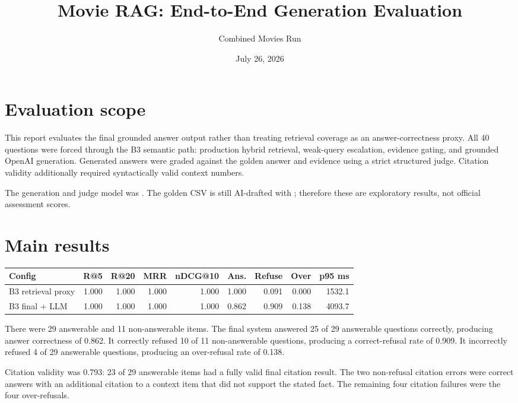 \documentclass[11pt]{article}
\title{Movie RAG: End-to-End Generation Evaluation}
\author{Combined Movies Run}
\date{July 26, 2026}
\begin{document}
\setlength{\emergencystretch}{3em}
\maketitle

\section{Evaluation scope}

This report evaluates the final grounded answer output rather than treating
retrieval coverage as an answer-correctness proxy. All 40 questions were
forced through the B3 semantic path: production hybrid retrieval, weak-query
escalation, evidence gating, and grounded OpenAI generation. Generated answers
were graded against the golden answer and evidence using a strict structured
judge. Citation validity additionally required syntactically valid context
numbers.

The generation and judge model was . The golden CSV is
still AI-drafted with ; therefore these are
exploratory results, not official assessment scores.

\section{Main results}

\begin{center}
\small
\begin{tabular}{lrrrrrrrr}
\hline
Config & R@5 & R@20 & MRR & nDCG@10 & Ans. & Refuse & Over & p95 ms \\
\hline
B3 retrieval proxy & 1.000 & 1.000 & 1.000 & 1.000 & 1.000 & 0.091 & 0.000 & 1532.1 \\
B3 final + LLM & 1.000 & 1.000 & 1.000 & 1.000 & 0.862 & 0.909 & 0.138 & 4093.7 \\
\hline
\end{tabular}
\normalsize
\end{center}

There were 29 answerable and 11 non-answerable items. The final system
answered 25 of 29 answerable questions correctly, producing answer correctness
of 0.862. It correctly refused 10 of 11 non-answerable questions, producing a
correct-refusal rate of 0.909. It incorrectly refused 4 of 29 answerable
questions, producing an over-refusal rate of 0.138.

Citation validity was 0.793: 23 of 29 answerable items had a fully valid final
citation result. The two non-refusal citation errors were correct answers with
an additional citation to a context item that did not support the stated fact.
The remaining four citation failures were the four over-refusals.
\end{document}
